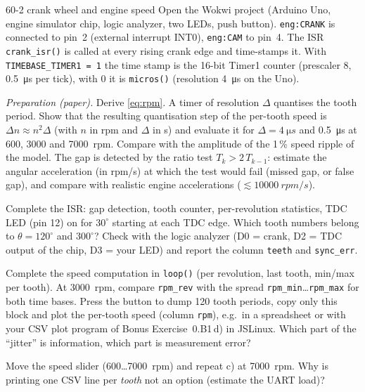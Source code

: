 \begin{exercise}{60-2 crank wheel and engine speed}{\Wokwi}
Open the Wokwi project  (Arduino Uno, engine
simulator chip, logic analyzer, two LEDs, push button). \texttt{eng:CRANK}
is connected to pin~2 (external interrupt INT0), \texttt{eng:CAM} to pin~4.
The ISR \texttt{crank\_isr()} is called at every rising crank edge and
time-stamps it. With \texttt{TIMEBASE\_TIMER1 = 1} the time stamp is the
16-bit Timer1 counter (prescaler 8, \SI{0.5}{\micro s} per tick), with 0 it
is \texttt{micros()} (resolution \SI{4}{\micro s} on the Uno).
\begin{tasks}
  \item \emph{Preparation (paper).} Derive \eqref{eq:rpm}. A timer of resolution
    $\Delta$ quantises the tooth period. Show that the resulting quantisation
    step of the per-tooth speed is $\Delta n \approx n^2\Delta$ (with $n$ in rpm
    and $\Delta$ in s) and evaluate it for $\Delta=\SI{4}{\micro s}$ and
    \SI{0.5}{\micro s} at 600, 3000 and \SI{7000}{rpm}. Compare with the
    amplitude of the 1\,\% speed ripple of the model. The gap is detected by
    the ratio test $T_k > 2\,T_{k-1}$: estimate the angular acceleration
    (in rpm/s) at which the test would fail (missed gap, or false gap), and
    compare with realistic engine accelerations
    ($\lesssim\SI{10000}{rpm/s}$).
  \item Complete the ISR: gap detection, tooth counter, per-revolution
    statistics, TDC LED (pin 12) on for $30^\circ$ starting at each TDC
    edge. Which tooth numbers belong to $\theta=120^\circ$ and $300^\circ$?
    Check with the logic analyzer (D0 = crank, D2 = TDC output of the chip,
    D3 = your LED) and report the column \texttt{teeth} and
    \texttt{sync\_err}.
  \item Complete the speed computation in \texttt{loop()} (per revolution,
    last tooth, min/max per tooth). At \SI{3000}{rpm}, compare
    \texttt{rpm\_rev} with the spread \texttt{rpm\_min}\dots\texttt{rpm\_max}
    for both time bases. Press the button to dump 120 tooth periods, copy
    only this block and plot the per-tooth speed (column \texttt{rpm}), e.g.\
    in a spreadsheet or with your CSV plot program of Bonus Exercise~0.B1\,d)
    in JSLinux. Which part of the
    ``jitter'' is information, which part is measurement error?
  \item Move the speed slider (600\dots\SI{7000}{rpm}) and repeat c) at
    \SI{7000}{rpm}. Why is printing one CSV line per \emph{tooth} not an
    option (estimate the UART load)?
\end{tasks}
\end{exercise}

